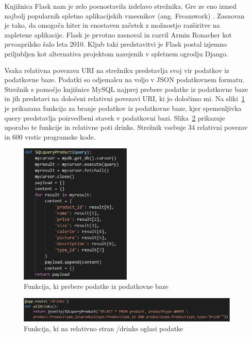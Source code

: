 \documentclass[a4paper, 12pt]{book}
\begin{document}
Knjižnica Flask nam je zelo poenostavila izdelavo strežnika. Gre ze eno izmed najbolj popularnih spletno aplikacijskih vmesnikov (ang. Freamwork) \cite{Flask}. Zasnovan je tako, da omogoča hiter in enostaven začetek z možnostjo razširitve na zapletene aplikacije. Flask je prvotno zasnoval in razvil Armin Ronacher kot prvoaprilsko šalo leta 2010. Kljub taki predstavitvi je Flask postal izjemno priljubljen kot alternativa projektom narejenih v spletnem ogrodju Django.

Vsaka relativna povezava URI na strežniku predstavlja svoj vir podatkov iz podatkovne baze. Podatki so odjemalcu na voljo v JSON podatkovnem formatu. Strežnik s pomočjo knjižnice MySQL najprej prebere podatke iz podatkovne baze in jih predstavi na določeni relativni povezavi URI, ki jo določimo mi. Na sliki~\ref{Drinks_DB_function} je prikazana funkcija za branje podatkov iz podatkovne baze, kjer spemenljivka query predstavlja poizvedbeni stavek v podatkovni bazi. Slika~\ref{Drinks_URI} prikazuje uporabo te funkcije in relativne poti drinks. Strežnik vsebuje 34 relativni povezav in 600 vrstic programske kode.


\begin{figure}[!htb]
\begin{center}
\includegraphics[width=0.5\textwidth]{drinks_1.jpg}
\caption{Funkcija, ki prebere podatke iz podatkovne baze}
\label{Drinks_DB_function}
\end{center}
\end{figure}

\begin{figure}[!htb]
\begin{center}
\includegraphics[width=14cm]{drinks_2.jpg}
\caption{Funkcija, ki na relativno stran /drinks oglasi podatke}
\label{Drinks_URI}
\end{center}
\end{figure}
\end{document}
